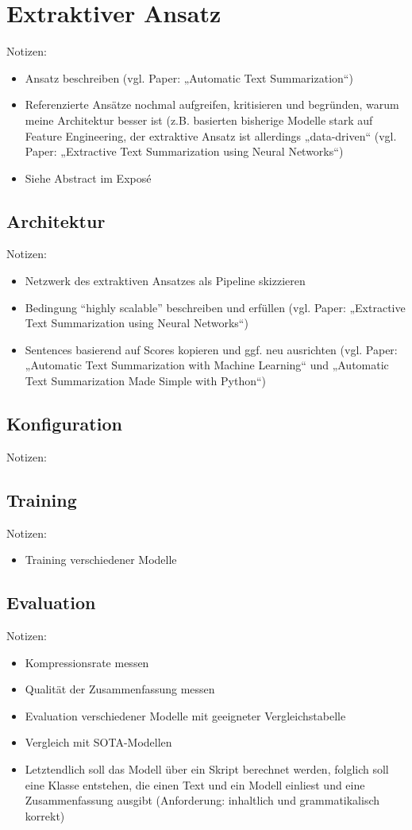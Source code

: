 \chapter{Extraktiver Ansatz}
\thispagestyle{fancy}
\label{chap:Extraktiver Ansatz}

Notizen:
\begin{itemize}
	\item Ansatz beschreiben (vgl. Paper: „Automatic Text Summarization“)
	\item Referenzierte Ansätze nochmal aufgreifen, kritisieren und begründen, warum meine Architektur besser ist (z.B. basierten bisherige Modelle stark auf Feature Engineering, der extraktive Ansatz ist allerdings „data-driven“ (vgl. Paper: „Extractive Text Summarization using Neural Networks“)
	\item Siehe Abstract im Exposé
\end{itemize}


\section{Architektur}
Notizen:
\begin{itemize}
	\item Netzwerk des extraktiven Ansatzes als Pipeline skizzieren
	\item Bedingung “highly scalable” beschreiben und erfüllen (vgl. Paper: „Extractive Text Summarization using Neural Networks“)
	\item Sentences basierend auf Scores kopieren und ggf. neu ausrichten (vgl. Paper: „Automatic Text Summarization with Machine Learning“ und „Automatic Text Summarization Made Simple with Python“)
\end{itemize}


\section{Konfiguration}
Notizen:


\section{Training}
Notizen:
\begin{itemize}
	\item Training verschiedener Modelle
\end{itemize}


\section{Evaluation}
Notizen:
\begin{itemize}
	\item Kompressionsrate messen
	\item Qualität der Zusammenfassung messen
	\item Evaluation verschiedener Modelle mit geeigneter Vergleichstabelle
	\item Vergleich mit SOTA-Modellen
	\item Letztendlich soll das Modell über ein Skript berechnet werden, folglich soll eine Klasse entstehen, die einen Text und ein Modell einliest und eine Zusammenfassung ausgibt (Anforderung: inhaltlich und grammatikalisch korrekt)
\end{itemize}
